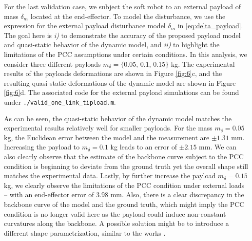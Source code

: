 For the last validation case, we subject the soft robot to an external payload of mass $\delta_m$ located at the end-effector. To model the disturbance, we use the expression for the external payload disturbance model $\delta_m$ in \eqref{eq:delta_payload}. The goal here is \textit{i)} to demonstrate the accuracy of the proposed payload model and quasi-static behavior of the dynamic model, and \textit{ii)} to highlight the limitations of the PCC assumptions under certain conditions. In this analysis, we consider three different payloads $m_\delta = \{0.05,\,0.1,\,0.15\}$ kg.
The experimental results of the payloads deformations are shown in Figure \ref{fig:6}c, and the resulting quasi-static deformations of the dynamic model are shown in Figure \ref{fig:6}d. The associated code for the external payload simulations can be found under \texttt{./valid\_one\_link\_tipload.m}.

As can be seen, the quasi-static behavior of the dynamic model matches the experimental results relatively well for smaller payloads. For the mass $m_\delta = 0.05$ kg, the Euclidean error between the model and the measurement are $\pm1.31$ mm. Increasing the payload to $m_\delta = 0.1$ kg leads to an error of $\pm2.15$ mm. We can also clearly observe that the estimate of the backbone curve subject to the PCC condition is beginning to deviate from the ground truth yet the overall shape still matches the experimental data. Lastly, by further increase the payload $m_\delta = 0.15$ kg, we clearly observe the limitations of the PCC condition under external loads -- with an end-effector error of $3.98$ mm. Also, there is a clear discrepancy in the backbone curve of the model and the ground truth, which might imply the PCC condition is no longer valid here as the payload could induce non-constant curvatures along the backbone. A possible solution might be to introduce a different shape parametrization, similar to the works \cite{Chirikjian1994,Boyer2021,Renda2020,DellaSantina2020}.

